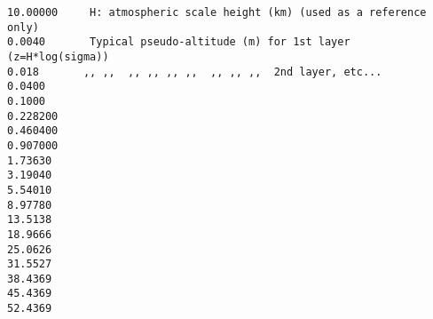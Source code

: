 \begin{verbatim}
10.00000     H: atmospheric scale height (km) (used as a reference only)
0.0040       Typical pseudo-altitude (m) for 1st layer (z=H*log(sigma))
0.018       ,, ,,  ,, ,, ,, ,,  ,, ,, ,,  2nd layer, etc...
0.0400
0.1000
0.228200
0.460400
0.907000
1.73630
3.19040
5.54010
8.97780
13.5138
18.9666
25.0626
31.5527
38.4369
45.4369
52.4369
\end{verbatim}
